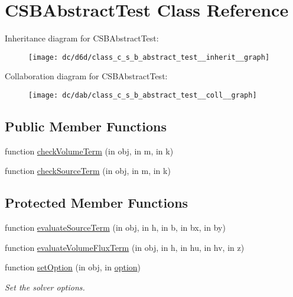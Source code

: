 \hypertarget{class_c_s_b_abstract_test}{}\section{C\+S\+B\+Abstract\+Test Class Reference}
\label{class_c_s_b_abstract_test}


Inheritance diagram for C\+S\+B\+Abstract\+Test\+:
\nopagebreak
\begin{figure}[H]
\begin{center}
\leavevmode
\texttt{[image: dc/d6d/class\_c\_s\_b\_abstract\_test\_\_inherit\_\_graph]}
\end{center}
\end{figure}


Collaboration diagram for C\+S\+B\+Abstract\+Test\+:
\nopagebreak
\begin{figure}[H]
\begin{center}
\leavevmode
\texttt{[image: dc/dab/class\_c\_s\_b\_abstract\_test\_\_coll\_\_graph]}
\end{center}
\end{figure}
\subsection*{Public Member Functions}
\begin{DoxyCompactItemize}
\item 
function \hyperlink{class_c_s_b_abstract_test_ae7f6be3eceb50757737ec89281028381}{check\+Volume\+Term} (in obj, in m, in k)
\item 
function \hyperlink{class_c_s_b_abstract_test_a4d4763be0ab20e19af8256837a0e2a05}{check\+Source\+Term} (in obj, in m, in k)
\end{DoxyCompactItemize}
\subsection*{Protected Member Functions}
\begin{DoxyCompactItemize}
\item 
function \hyperlink{class_c_s_b_abstract_test_a146f56e46794475ea949df8573b5baad}{evaluate\+Source\+Term} (in obj, in h, in b, in bx, in by)
\item 
function \hyperlink{class_c_s_b_abstract_test_a79e1c08603e7127d3017f37e79b0d8c4}{evaluate\+Volume\+Flux\+Term} (in obj, in h, in hu, in hv, in z)
\item 
function \hyperlink{class_c_s_b_abstract_test_a33eb5450247a7aa1999dee3a077e31f6}{set\+Option} (in obj, in \hyperlink{class_ndg_phys_af91f4c54b93504e76b38a5693774dff1}{option})
\begin{DoxyCompactList}\small\item\em Set the solver options. \end{DoxyCompactList}\end{DoxyCompactItemize}
